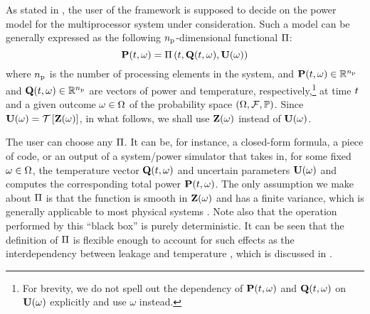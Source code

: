 As stated in , the user of the framework is supposed to decide on the power model for the multiprocessor system under consideration.
Such a model can be generally expressed as the following ${n_\text{p}}$-dimensional functional $\oPower$:
\begin{equation} \elabel{power-model}
  \vP(\t, \o) = \oPower{\t, \vTO(\t, \o), \vU(\o)}
\end{equation}
where ${n_\text{p}}$ is the number of processing elements in the system, and $\mathbf{P}(t, \omega) \in \mathbb{R}^{n_\text{p}}$ and $\mathbf{Q}(t, \omega) \in \mathbb{R}^{n_\text{p}}$ are vectors of power and temperature, respectively,\footnote{For brevity, we do not spell out the dependency of $\mathbf{P}(t, \omega)$ and $\mathbf{Q}(t, \omega)$ on $\mathbf{U}(\omega)$ explicitly and use $\omega$ instead.} at time $t$ and a given outcome $\omega \in \Omega$ of the probability space $(\Omega, \mathcal{F}, \mathbb{P})$.
Since $\vU(\o) = \oTransform{\vZ(\o)}$, in what follows, we shall use $\mathbf{Z}(\omega)$ instead of $\mathbf{U}(\omega)$.

The user can choose any $\oPower$. It can be, for instance, a closed-form formula, a piece of code, or an output of a system/power simulator that takes in, for some fixed $\omega \in \Omega$, the temperature vector $\mathbf{Q}(t, \omega)$ and uncertain parameters $\mathbf{U}(\omega)$ and computes the corresponding total power $\mathbf{P}(t, \omega)$.
The only assumption we make about $\oPower$ is that the function is smooth in $\mathbf{Z}(\omega)$ and has a finite variance, which is generally applicable to most physical systems \cite{xiu2010}.
Note also that the operation performed by this ``black box'' is purely deterministic.
It can be seen that the definition of $\oPower$ is flexible enough to account for such effects as the interdependency between leakage and temperature \cite{srivastava2010, liu2007}, which is discussed in .
